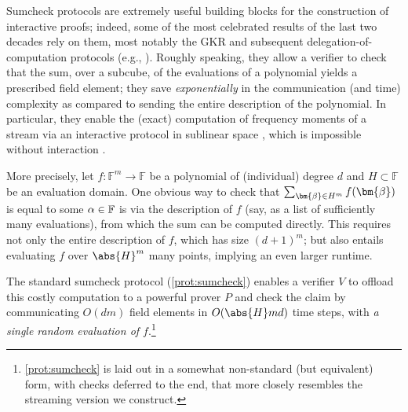 \documentclass[a4paper,UKenglish,cleveref, autoref, thm-restate]{lipics-v2021}
\theoremstyle{definition}
\newcommand{\field}{\mathbb{F}}
\newcommand{\dimension}{m}
\newcommand{\degree}{d}
\newcommand{\evaluationpoint}{\bm{\fe2}}
\newcommand{\cubeside}{H}
\def\fe#1{
    \ifnum#1=1
        \alpha
    \else
    \ifnum#1=2
        \beta
    \else
    \ifnum#1=3
        \gamma
    \fi\fi\fi
}
\begin{document}
Sumcheck protocols are extremely useful building blocks for the construction of interactive proofs; indeed, some of the most celebrated results of the last two decades rely on them, most notably the GKR \cite{GKR08} and subsequent delegation-of-computation protocols (e.g., \cite{RVW13, RRR19, RR20}). Roughly speaking, they allow a verifier to check that the sum, over a subcube, of the evaluations of a polynomial yields a prescribed field element; they save \emph{exponentially} in the communication (and time) complexity as compared to sending the entire description of the polynomial. In particular, they enable the (exact) computation of frequency moments of a stream via an interactive protocol in sublinear space \cite{CCMT14}, which is impossible without interaction \cite{AMS99}.

More precisely, let $f: \field^\dimension \to \field$ be a polynomial of (individual) degree $\degree$ and $\cubeside \subset \field$ be an evaluation domain. One obvious way to check that $\sum_{\evaluationpoint \in H^\dimension} f(\evaluationpoint)$ is equal to some $\fe1 \in \field$ is via the description of $f$ (say, as a list of sufficiently many evaluations), from which the sum can be computed directly. This requires not only the entire description of $f$, which has size $(\degree + 1)^\dimension$; but also entails evaluating $f$ over $\abs{\cubeside}^\dimension$ many points, implying an even larger runtime.

The standard sumcheck protocol (\cref{prot:sumcheck}) enables a verifier $V$ to offload this costly computation to a powerful prover $P$ and check the claim by communicating $O(\degree\dimension)$ field elements in $O(\abs{\cubeside} \dimension \degree)$ time steps, with \emph{a single random evaluation of $f$}.\footnote{\cref{prot:sumcheck} is laid out in a somewhat non-standard (but equivalent) form, with checks deferred to the end, that more closely resembles the streaming version we construct.}
\end{document}
